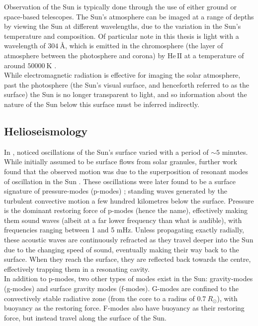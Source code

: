 \documentclass[11pt,a4paper,onecolumn]{report}
\newcommand*\chem[1]{\ensuremath{\mathrm{#1}}}
\begin{document}
Observation of the Sun is typically done through the use of either ground or
space-based telescopes. The Sun's atmosphere can be imaged at a range of depths
by viewing the Sun at different wavelengths, due to the variation in the Sun's
temperature and composition. Of particular note in this thesis is light with a
wavelength of \(\SI{304}{\angstrom}\), which is emitted in the chromosphere (the
layer of atmosphere between the photosphere and corona) by \(\chem{He \, II}\)
at a temperature of around \(\SI{50000}{\kelvin}\)
\citep{herbert_friedman_solar_1962}. \\

While electromagnetic radiation is effective for imaging the solar atmosphere,
past the photosphere (the Sun's visual surface, and henceforth referred to as
the surface) the Sun is no longer transparent to light, and so information about
the nature of the Sun below this surface must be inferred indirectly. \\


%
\subsection{Helioseismology}
%
\label{sec:HSM}

In \citeyear{leighton_velocity_1962}, \citeauthor{leighton_velocity_1962}
noticed oscillations of the Sun's surface varied with a period of \(\sim
5\) minutes. While initially assumed to be surface flows from solar granules,
further work found that the observed motion was due to the superposition of
resonant modes of oscillation in the Sun \citep{ulrich_five-minute_1970}. These
oscillations were later found to be a surface signature of pressure-modes
(p-modes) \citep{deubner_observations_1975}; standing waves generated by the
turbulent convective motion a few hundred kilometres below the surface. Pressure
is the dominant restoring force of p-modes (hence the name), effectively making
them sound waves (albeit at a far lower frequency than what is audible), with
frequencies ranging between 1 and 5 mHz. Unless propagating exactly radially,
these acoustic waves are continuously refracted as they travel deeper into the
Sun due to the changing speed of sound, eventually making their way back to the
surface. When they reach the surface, they are reflected back towards the
centre, effectively trapping them in a resonating cavity. \\

In addition to p-modes, two other types of modes exist in the Sun: gravity-modes
(g-modes) and surface gravity modes (f-modes). G-modes are confined to the
convectively stable radiative zone (from the core to a radius of $\SI{0.7}
{R_\odot}$), with buoyancy as the restoring force. F-modes also have buoyancy as
their restoring force, but instead travel along the surface of the Sun. \\
\end{document}
